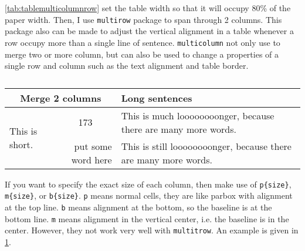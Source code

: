 \cref{tab:tablemulticolumnrow} set the table width so that it will occupy 80\% of the paper width. Then, I use \verb|multirow| package to span through 2 columns. This package also can be made to adjust the vertical alignment in a table whenever a row occupy more than a single line of sentence. \verb|multicolumn| not only use to merge two or more column, but can also be used to change a properties of a single row and column such as the text alignment and table border. 

\begin{table}[H]\centering
	\caption{\jadual}	%
	\begin{tabular}{|p{3cm}|r|b{7cm}|}
		\hline
		\multicolumn{2}{|c|}{\textbf{Merge 2 columns}} & \textbf{Long sentences} \\ \hline
		\multirow{2}{*}[-4mm]{This is short.} & \multicolumn{1}{c|}{173} & This is much loooooooonger, because there are many more words.  \\ \cline{2-3}
		& put some word here & This is still loooooooonger, because there are many more words. \\ \hline
	\end{tabular} 
	\label{tab:tablemulticolumn}
\end{table} 

If you want to specify the exact size of each column, then make use of \verb|p{size}|, \verb|m{size}|, or \verb|b{size}|. \texttt{p} means normal cells, they are like parbox with alignment at the top line. \texttt{b} means alignment at the bottom, so the baseline is at the bottom line. \texttt{m} means alignment in the vertical center, i.e. the baseline is in the center. However, they not work very well with \verb|multitrow|. An example is given in \cref{tab:tablemulticolumn}.

\paperend	%
